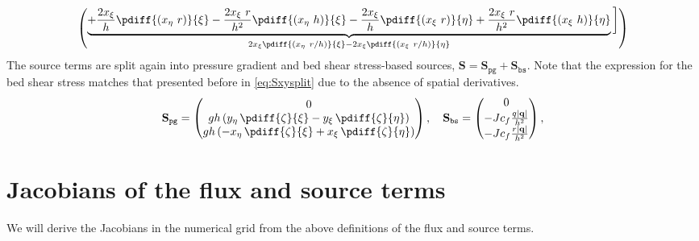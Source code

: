 {{\begin{align}
\begin{pmatrix}
			\underbrace{+ \frac{2 x_{\xi}}{h} \pdiff{(x_{\eta}\ r)}{\xi}
				- \frac{2 x_{\xi}\ r}{h^2} \pdiff{(x_{\eta}\ h)}{\xi}
				- \frac{2 x_{\xi}}{h} \pdiff{(x_{\xi}\ r)}{\eta}
				+ \frac{2 x_{\xi}\ r}{h^2} \pdiff{(x_{\xi}\ h)}{\eta}}_{2 x_{\xi} \pdiff{(x_{\eta}\ r/h)}{\xi}
				- 2 x_{\xi} \pdiff{(x_{\xi}\ r/h)}{\eta}}
			\bigg]
		\end{pmatrix}
	\end{align}
The source terms are split again into pressure gradient and bed shear stress-based sources, $\mathbf{S} = \mathbf{S}_{\texttt{pg}} + \mathbf{S}_{\texttt{bs}}$.
Note that the expression for the bed shear stress matches that presented before in \autoref{eq:Sxysplit} due to the absence of spatial derivatives.
%
\begin{align}
	\mathbf{S}_{\texttt{pg}}=
	\begin{pmatrix}
		0\\
		g h \left( y_{\eta}\, \pdiff{\zeta}{\xi} - y_{\xi}\, \pdiff{\zeta}{\eta} \right)\\
		g h \left( -x_{\eta}\, \pdiff{\zeta}{\xi} + x_{\xi}\, \pdiff{\zeta}{\eta} \right)
	\end{pmatrix},
	\quad
	\mathbf{S}_{\texttt{bs}}=
	\begin{pmatrix}
		0 \\
		- J c_f \frac{q|\mathbf{q}|}{h^2} \\
		- J c_f \frac{r|\mathbf{q}|}{h^2}
	\end{pmatrix},
\end{align}
\section{Jacobians of the flux and source terms}
We will derive the Jacobians in the numerical grid from the above definitions of the flux and source terms.
}}
